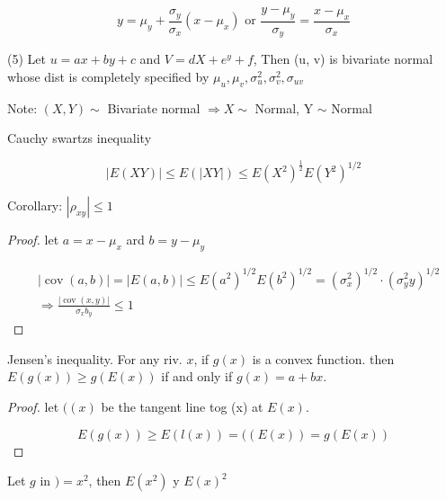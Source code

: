 \documentclass[10pt]{article}
\begin{document}
$$
y=\mu_{y}+\frac{\sigma_{y}}{\sigma_{x}}\left(x-\mu_{x}\right) \text { or } \frac{y-\mu_{y}}{\sigma_{y}}=\frac{x-\mu_{x}}{\sigma_{x}}
$$

(5) Let $u=a x+b y+c$ and $V=d X+e^{y}+f$, Then (u, v) is bivariate normal whose dist is completely specified by $\mu_{u}, \mu_{v}, \sigma_{u}^{2}, \sigma_{v}^{2}, \sigma_{u v}$ 

Note: $(X, Y) \sim$ Bivariate normal $\Rightarrow X \sim $ Normal, Y $\sim$ Normal

\begin{theorem}
    Cauchy swartzs inequality
\end{theorem}

$$
\left|E\left(X Y\right)\right| \leq E(|X Y|) \leq E\left(X^{2}\right)^{\frac{1}{2}} E\left(Y^{2}\right)^{1 / 2}
$$

Corollary: $\left|\rho_{x y}\right| \leq 1$

\begin{proof}
    let $a=x-\mu_{x}$ ard $b=y-\mu_{y}$

$$
\begin{aligned}
& |\operatorname{cov}(a, b)|=|E(a, b)| \leq E\left(a^{2}\right)^{1 / 2} E\left(b^{2}\right)^{1 / 2}=\left(\sigma_{x}^{2}\right)^{1 / 2} \cdot\left(\sigma_{y}^{2} y\right)^{1 / 2} \\
& \Rightarrow \frac{|\operatorname{cov}(x, y)|}{\sigma_{x} b_{y}} \leq 1
\end{aligned}
$$

\end{proof}


\begin{theorem}
    Jensen's inequality. For any riv. $x$, if $g(x)$ is a convex function. then $E(g(x)) \geqslant g(E(x))$ if and only if $g(x)=a+b x$. 
\end{theorem}

\begin{proof}
    let $((x)$ be the tangent line tog (x) at $E(x)$.

$$
E(g(x)) \geqslant E(l(x))=((E(x))=g(E(x))
$$
\end{proof}

\begin{example}
    Let $g$ in $)=x^{2}$, then $E\left(x^{2}\right)$ y $E(x)^{2}$

\end{example}
\end{document}
